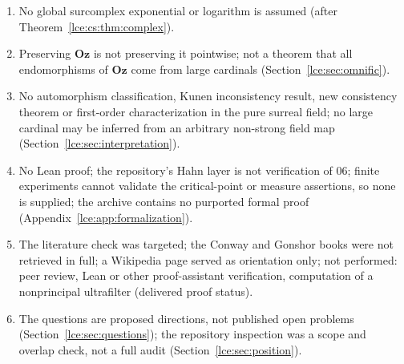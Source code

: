 \documentclass[11pt,letterpaper]{article}
\numberwithin{equation}{section}
\theoremstyle{definition}
\theoremstyle{remark}
\newcommand{\Oz}{\mathbf{Oz}}
\newcommand{\thref}[1]{Theorem~\ref{#1}}
\begin{document}
\begin{enumerate}[label=06.\arabic*]
its normal-measure ultrapower's landing spectrum
(Section~\ref{lce:cs:sec:compactness}).
\item No global surcomplex exponential or logarithm is assumed
(after \thref{lce:cs:thm:complex}).
\item Preserving $\Oz$ is not preserving it pointwise; not a theorem that all
endomorphisms of $\Oz$ come from large cardinals (Section~\ref{lce:sec:omnific}).
\item No automorphism classification, Kunen inconsistency result, new
consistency theorem or first-order characterization in the pure surreal
field; no large cardinal may be inferred from an arbitrary non-strong field
map (Section~\ref{lce:sec:interpretation}).
\item No Lean proof; the repository's Hahn layer is not verification of
06; finite experiments cannot validate the critical-point or measure
assertions, so none is supplied; the archive contains no purported formal
proof (Appendix~\ref{lce:app:formalization}).
\item The literature check was targeted; the Conway and Gonshor books were
not retrieved in full; a Wikipedia page served as orientation only; not
performed: peer review, Lean or other proof-assistant verification,
computation of a nonprincipal ultrafilter (delivered proof status).
\item The questions are proposed directions, not published open problems
(Section~\ref{lce:sec:questions}); the repository inspection was a scope and
overlap check, not a full audit (Section~\ref{lce:sec:position}).
\end{enumerate}
\end{document}
